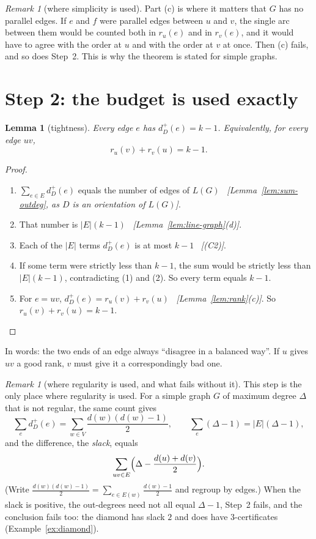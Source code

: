 \documentclass[11pt]{article}
\theoremstyle{plain}
\newtheorem{lemma}[theorem]{Lemma}
\theoremstyle{definition}
\theoremstyle{remark}
\newtheorem{remark}[theorem]{Remark}
\newcommand{\LG}{L(G)}
\newcommand{\st}[1]{E(#1)}
\newcommand{\dout}{d^{+}}
\newcommand{\why}[1]{\unskip\ \textit{[#1]}}
\newenvironment{steps}{\begin{enumerate}[label=(\arabic*),leftmargin=2.2em,itemsep=0.35em]}{\end{enumerate}}
\begin{document}
\begin{remark}[where simplicity is used]\label{rem:simple}
Part (c) is where it matters that $G$ has no parallel edges. If $e$ and $f$ were parallel edges
between $u$ and $v$, the single arc between them would be counted both in $r_u(e)$ and in
$r_v(e)$, and it would have to agree with the order at $u$ and with the order at $v$ at once.
Then (c) fails, and so does Step~2. This is why the theorem is stated for simple graphs.
\end{remark}

\section{Step 2: the budget is used exactly}\label{sec:step2}

\begin{lemma}[tightness]\label{lem:tight}
Every edge $e$ has $\dout_D(e)=k-1$. Equivalently, for every edge $uv$,
\[
  r_u(v)+r_v(u)=k-1 .
\]
\end{lemma}

\begin{proof}
\begin{steps}
  \item $\sum_{e\in E}\dout_D(e)$ equals the number of edges of $\LG$
    \why{Lemma~\ref{lem:sum-outdeg}, as $D$ is an orientation of $\LG$}.
  \item That number is $|E|(k-1)$ \why{Lemma~\ref{lem:line-graph}(d)}.
  \item Each of the $|E|$ terms $\dout_D(e)$ is at most $k-1$ \why{(C2)}.
  \item If some term were strictly less than $k-1$, the sum would be strictly less than
    $|E|(k-1)$, contradicting (1) and (2). So every term equals $k-1$.
  \item For $e=uv$, $\dout_D(e)=r_u(v)+r_v(u)$ \why{Lemma~\ref{lem:rank}(c)}. So
    $r_u(v)+r_v(u)=k-1$. \qedhere
\end{steps}
\end{proof}

In words: the two ends of an edge always ``disagree in a balanced way''. If $u$ gives $uv$ a
good rank, $v$ must give it a correspondingly bad one.

\begin{remark}[where regularity is used, and what fails without it]\label{rem:regular}
This step is the only place where regularity is used. For a simple graph $G$ of maximum degree
$\Delta$ that is not regular, the same count gives
\[
  \sum_{e}\dout_D(e)=\sum_{w\in V}\frac{d(w)(d(w)-1)}{2},
  \qquad
  \sum_{e}(\Delta-1)=|E|(\Delta-1),
\]
and the difference, the \emph{slack}, equals
\[
  \sum_{uv\in E}\Bigl(\Delta-\frac{d(u)+d(v)}{2}\Bigr).
\]
(Write $\tfrac{d(w)(d(w)-1)}{2}=\sum_{e\in\st{w}}\tfrac{d(w)-1}{2}$ and regroup by edges.) When the
slack is positive, the out-degrees need not all equal $\Delta-1$, Step~2 fails, and the
conclusion fails too: the diamond has slack $2$ and does have $3$-certificates
(Example~\ref{ex:diamond}).
\end{remark}
\end{document}
